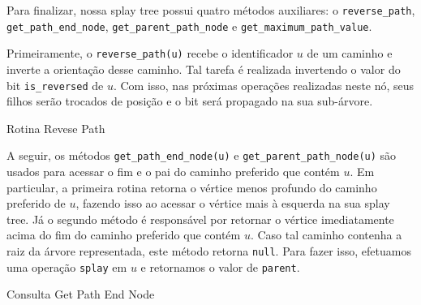 Para finalizar, nossa splay tree possui quatro métodos auxiliares: o \texttt{reverse\_path}, \texttt{get\_path\_end\_node}, \texttt{get\_parent\_path\_node} e \texttt{get\_maximum\_path\_value}.

Primeiramente, o \texttt{reverse\_path(u)} recebe o identificador $u$ de um caminho e inverte a orientação desse caminho. Tal tarefa é realizada invertendo o valor do bit \texttt{is\_reversed} de $u$. Com isso, nas próximas operações realizadas neste nó, seus filhos serão trocados de posição e o bit será propagado na sua sub-árvore.

\begin{algorithm}[h!]
    \caption{Rotina Revese Path}\label{splay:reverse-path}
    \begin{algorithmic}[1]
         
        \EndFunction
    \end{algorithmic}
\end{algorithm}

A seguir, os métodos \texttt{get\_path\_end\_node(u)} e \texttt{get\_parent\_path\_node(u)} são usados para acessar o fim e o pai do caminho preferido que contém $u$. Em particular, a primeira rotina retorna o vértice menos profundo do caminho preferido de $u$, fazendo isso ao acessar o vértice mais à esquerda na sua splay tree. Já o segundo método é responsável por retornar o vértice imediatamente acima do fim do caminho preferido que contém $u$. Caso tal caminho contenha a raiz da árvore representada, este método retorna \texttt{null}. Para fazer isso, efetuamos uma operação \texttt{splay} em $u$ e retornamos o valor de \texttt{parent}.

\begin{algorithm}[h!]
    \caption{Consulta Get Path End Node}\label{splay:get-path-end}
    \begin{algorithmic}[1]
        \EndWhile
        \State {}
        \EndFunction
    \end{algorithmic}
\end{algorithm}

